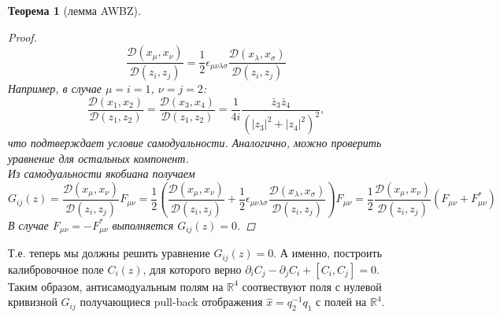 \documentclass[12pt]{article}
\newtheorem{theorem}{Теорема}[section]
\theoremstyle{definition}
\begin{document}
\begin{theorem}[лемма AWBZ]
\begin{proof}
        \begin{equation}
            \frac{\mathcal{D}(x_\mu,x_\nu)}{\mathcal{D}(z_i,z_j)}=\frac{1}{2}\epsilon_{\mu\nu\lambda\sigma}\frac{\mathcal{D}(x_\lambda,x_\sigma)}{\mathcal{D}(z_i,z_j)}
        \end{equation}
        Например, в случае $\mu=i=1$, $\nu=j=2$:
        \begin{equation}
            \frac{\mathcal{D}(x_1,x_2)}{\mathcal{D}(z_1,z_2)}=\frac{\mathcal{D}(x_3,x_4)}{\mathcal{D}(z_1,z_2)}=\frac{1}{4i}\frac{\bar{z}_3\bar{z}_4}{(|z_3|^2+|z_4|^2)^2},
        \end{equation}
        что подтверждает условие самодуальности. Аналогично, можно проверить уравнение для остальных компонент.\\
        Из самодуальности якобиана получаем
        \begin{equation}
            G_{ij}(z)=\frac{\mathcal{D}(x_\mu,x_\nu)}{\mathcal{D}(z_i,z_j)}F_{\mu\nu}=\frac{1}{2}\left(\frac{\mathcal{D}(x_\mu,x_\nu)}{\mathcal{D}(z_i,z_j)}+\frac{1}{2}\epsilon_{\mu\nu\lambda\sigma}\frac{\mathcal{D}(x_\lambda,x_\sigma)}{\mathcal{D}(z_i,z_j)}\right)F_{\mu\nu}=\frac{1}{2}\frac{\mathcal{D}(x_\mu,x_\nu)}{\mathcal{D}(z_i,z_j)}(F_{\mu\nu}+F^*_{\mu\nu})
        \end{equation}
        В случае $F_{\mu\nu}=-F^*_{\mu\nu}$ выполняется $G_{ij}(z)=0$.
    \end{proof}
    \end{theorem}
Т.е. теперь мы должны решить уравнение $G_{ij}(z) = 0$. А именно, построить калибровочное поле $C_i(z)$, для которого верно $\partial_iC_j - \partial_j C_i + [C_i,C_j] = 0$. Таким образом, антисамодуальным полям на $\mathbb{R}^4$ соотвествуют поля с нулевой кривизной $G_{ij}$ получающиеся pull-back отображения $\hat{x}=q_2^{-1}q_1$ с полей на $\mathbb{R}^4$.
\end{document}
